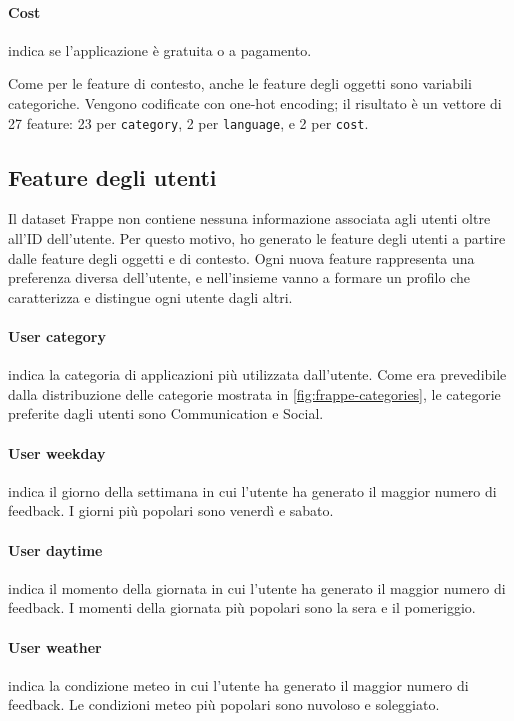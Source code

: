 \documentclass[12pt,italian]{report}
\begin{document}
\paragraph{Cost} indica se l'applicazione è gratuita o a pagamento.

\bigskip \noindent
Come per le feature di contesto, anche le feature degli oggetti sono variabili categoriche. Vengono codificate con one-hot encoding; il risultato è un vettore di 27 feature: 23 per \texttt{category}, 2 per \texttt{language}, e 2 per \texttt{cost}.

\subsection{Feature degli utenti}
Il dataset Frappe non contiene nessuna informazione associata agli utenti oltre all'ID dell'utente. Per questo motivo, ho generato le feature degli utenti a partire dalle feature degli oggetti e di contesto. Ogni nuova feature rappresenta una preferenza diversa dell'utente, e nell'insieme vanno a formare un profilo che caratterizza e distingue ogni utente dagli altri.

\paragraph{User category} indica la categoria di applicazioni più utilizzata dall'utente. Come era prevedibile dalla distribuzione delle categorie mostrata in \autoref{fig:frappe-categories}, le categorie preferite dagli utenti sono Communication e Social.

\paragraph{User weekday} indica il giorno della settimana in cui l'utente ha generato il maggior numero di feedback. I giorni più popolari sono venerdì e sabato.

\paragraph{User daytime} indica il momento della giornata in cui l'utente ha generato il maggior numero di feedback. I momenti della giornata più popolari sono la sera e il pomeriggio.

\paragraph{User weather} indica la condizione meteo in cui l'utente ha generato il maggior numero di feedback. Le condizioni meteo più popolari sono nuvoloso e soleggiato.
\end{document}
